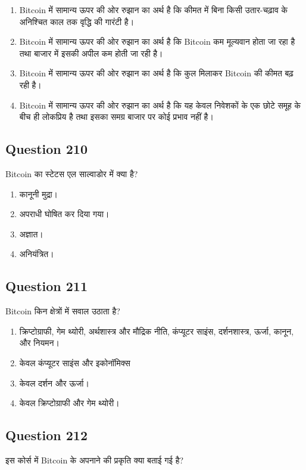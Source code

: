 \documentclass[12pt,a4paper]{article}
\begin{document}
\begin{enumerate}[label=\Alph*., leftmargin=*]
\item Bitcoin में सामान्य ऊपर की ओर रुझान का अर्थ है कि कीमत में बिना किसी उतार-चढ़ाव के अनिश्चित काल तक वृद्धि की गारंटी है।
\item Bitcoin में सामान्य ऊपर की ओर रुझान का अर्थ है कि Bitcoin कम मूल्यवान होता जा रहा है तथा बाजार में इसकी अपील कम होती जा रही है।
\item Bitcoin में सामान्य ऊपर की ओर रुझान का अर्थ है कि कुल मिलाकर Bitcoin की कीमत बढ़ रही है।
\item Bitcoin में सामान्य ऊपर की ओर रुझान का अर्थ है कि यह केवल निवेशकों के एक छोटे समूह के बीच ही लोकप्रिय है तथा इसका समग्र बाजार पर कोई प्रभाव नहीं है।
\end{enumerate}

\bigskip


\subsection*{Question 210}
Bitcoin का स्टेटस एल साल्वाडोर में क्या है?

\begin{enumerate}[label=\Alph*., leftmargin=*]
\item कानूनी मुद्रा।
\item अपराधी घोषित कर दिया गया।
\item अज्ञात।
\item अनियंत्रित।
\end{enumerate}

\bigskip


\subsection*{Question 211}
Bitcoin किन क्षेत्रों में सवाल उठाता है?

\begin{enumerate}[label=\Alph*., leftmargin=*]
\item क्रिप्टोग्राफी, गेम थ्योरी, अर्थशास्त्र और मौद्रिक नीति, कंप्यूटर साइंस, दर्शनशास्त्र, ऊर्जा, कानून, और नियमन।
\item केवल कंप्यूटर साइंस और इकोनॉमिक्स
\item केवल दर्शन और ऊर्जा।
\item केवल क्रिप्टोग्राफी और गेम थ्योरी।
\end{enumerate}

\bigskip


\subsection*{Question 212}
इस कोर्स में Bitcoin के अपनाने की प्रकृति क्या बताई गई है?
\end{document}
